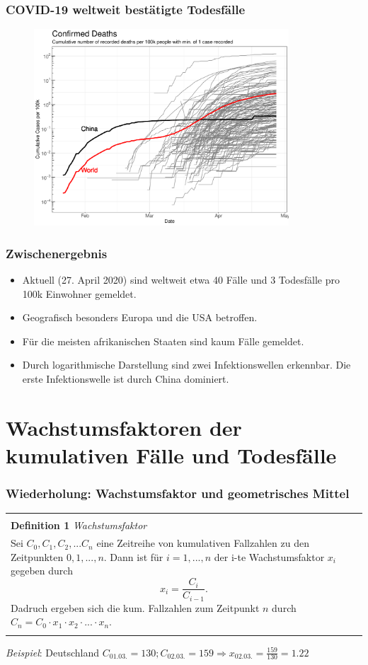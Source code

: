 \documentclass{beamer}
\newenvironment{boxeded}
    {\begin{center}
    \begin{tabular}{|p{0.9\textwidth}|}
    \hline\\
    }
    { 
    \\\\\hline
    \end{tabular} 
    \end{center}
    }
\begin{document}
 \begin{frame}
 	\frametitle{COVID-19 weltweit bestätigte Todesfälle}
	\begin{figure}
		\centering
		\includegraphics[width = 270pt]{Cases_cumulative_deaths.pdf}
	\end{figure}
 \end{frame}

 \begin{frame}
 	\frametitle{Zwischenergebnis}
 	\begin{itemize}
 		\item Aktuell (27. April 2020) sind weltweit etwa 40 Fälle und 3 Todesfälle pro 100k Einwohner gemeldet.
 		\item Geografisch besonders Europa und die USA betroffen. 
 		\item Für die meisten afrikanischen Staaten sind kaum Fälle gemeldet.
 		\item Durch logarithmische Darstellung sind zwei Infektionswellen erkennbar. Die erste Infektionswelle ist durch China dominiert.
 	\end{itemize}
 \end{frame}

\section{Wachstumsfaktoren der kumulativen Fälle und Todesfälle}
\begin{frame}
	\frametitle{Wiederholung: Wachstumsfaktor und geometrisches Mittel}
	\begin{boxeded}
		\textbf{Definition 1} \textit{Wachstumsfaktor}\\
		Sei $C_0, C_1, C_2, ... C_n$ eine Zeitreihe von kumulativen Fallzahlen zu den Zeitpunkten $0, 1, ..., n$. Dann ist für $i = 1, ..., n$ der i-te Wachstumsfaktor $x_i$ gegeben durch $$ x_i = \frac{C_i}{C_{i-1}}.$$
		Dadruch ergeben sich die kum. Fallzahlen zum Zeitpunkt $n$ durch $C_n = C_0 \cdot x_1 \cdot x_2 \cdot ... \cdot x_n$.
	\end{boxeded}
	\pause
	\emph{Beispiel}: Deutschland $C_{01.03.} = 130; C_{02.03.}= 159 \Rightarrow x_{02.03.}=\frac{159}{130}=1.22$
\end{frame}
\end{document}
